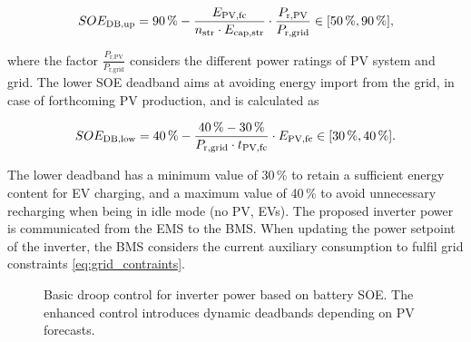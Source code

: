 \documentclass[final,5p,times,twocolumn]{elsarticle}
\begin{document}
\begin{equation}
\small
    SOE_{\text{DB,up}} = 90\,\% - \frac{E_{\text{PV,fc}}}{n_{\text{str}} \cdot E_{\text{cap,str}}} \cdot \frac{P_{\text{r,PV}}}{P_{\text{r,grid}}} \in [50\,\%, 90\,\%],
\end{equation}

where the factor $\frac{P_{\text{r,PV}}}{P_{\text{r,grid}}}$ considers the different power ratings of PV system and grid. The lower SOE deadband aims at avoiding energy import from the grid, in case of forthcoming PV production, and is calculated as

\begin{equation}
\small
    SOE_{\text{DB,low}} = 40\,\% - \frac{40\,\% - 30\,\%}{P_{\text{r,grid}}\cdot t_{\text{PV,fc}}} \cdot E_{\text{PV,fc}} \in [30\,\%, 40\,\%].
\end{equation}

The lower deadband has a minimum value of 30\,\% to retain a sufficient energy content for EV charging, and a maximum value of 40\,\% to avoid unnecessary recharging when being in idle mode (no PV, EVs). The proposed inverter power is communicated from the EMS to the BMS. When updating the power setpoint of the inverter, the BMS considers the current auxiliary consumption to fulfil grid constraints \eqref{eq:grid_contraints}.

\begin{figure}
\centering
\resizebox{8.7cm}{4cm}{%

}
\caption{Basic droop control for inverter power based on battery SOE. The enhanced control introduces dynamic deadbands depending on PV forecasts.}
\label{fig:droop}
\end{figure}
\end{document}
